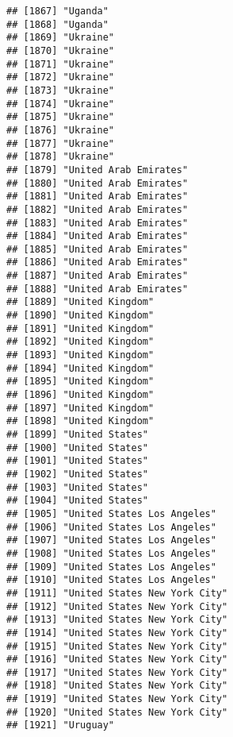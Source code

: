 \documentclass[]{article}
\begin{document}
\begin{verbatim}
## [1867] "Uganda"                             
## [1868] "Uganda"                             
## [1869] "Ukraine"                            
## [1870] "Ukraine"                            
## [1871] "Ukraine"                            
## [1872] "Ukraine"                            
## [1873] "Ukraine"                            
## [1874] "Ukraine"                            
## [1875] "Ukraine"                            
## [1876] "Ukraine"                            
## [1877] "Ukraine"                            
## [1878] "Ukraine"                            
## [1879] "United Arab Emirates"               
## [1880] "United Arab Emirates"               
## [1881] "United Arab Emirates"               
## [1882] "United Arab Emirates"               
## [1883] "United Arab Emirates"               
## [1884] "United Arab Emirates"               
## [1885] "United Arab Emirates"               
## [1886] "United Arab Emirates"               
## [1887] "United Arab Emirates"               
## [1888] "United Arab Emirates"               
## [1889] "United Kingdom"                     
## [1890] "United Kingdom"                     
## [1891] "United Kingdom"                     
## [1892] "United Kingdom"                     
## [1893] "United Kingdom"                     
## [1894] "United Kingdom"                     
## [1895] "United Kingdom"                     
## [1896] "United Kingdom"                     
## [1897] "United Kingdom"                     
## [1898] "United Kingdom"                     
## [1899] "United States"                      
## [1900] "United States"                      
## [1901] "United States"                      
## [1902] "United States"                      
## [1903] "United States"                      
## [1904] "United States"                      
## [1905] "United States Los Angeles"          
## [1906] "United States Los Angeles"          
## [1907] "United States Los Angeles"          
## [1908] "United States Los Angeles"          
## [1909] "United States Los Angeles"          
## [1910] "United States Los Angeles"          
## [1911] "United States New York City"        
## [1912] "United States New York City"        
## [1913] "United States New York City"        
## [1914] "United States New York City"        
## [1915] "United States New York City"        
## [1916] "United States New York City"        
## [1917] "United States New York City"        
## [1918] "United States New York City"        
## [1919] "United States New York City"        
## [1920] "United States New York City"        
## [1921] "Uruguay"                            

\end{verbatim}
\end{document}
